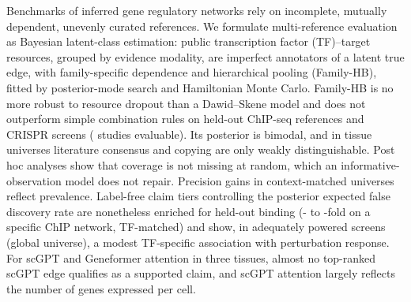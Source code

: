 Benchmarks of inferred gene regulatory networks rely on incomplete, mutually dependent, unevenly curated references.
We formulate multi-reference evaluation as Bayesian latent-class estimation: \nNAnnotHeldin{} public transcription factor (TF)--target resources, grouped by evidence modality, are imperfect annotators of a latent true edge, with family-specific dependence and hierarchical pooling (Family-HB), fitted by posterior-mode search and Hamiltonian Monte Carlo.
Family-HB is no more robust to resource dropout than a Dawid--Skene model and does not outperform simple combination rules on held-out ChIP-seq references and \nCohN{} CRISPR screens (\nRepPassAllD{} studies evaluable).
Its posterior is bimodal, and in tissue universes literature consensus and copying are only weakly distinguishable.
Post hoc analyses show that coverage is not missing at random, which an informative-observation model does not repair.
Precision gains in context-matched universes reflect prevalence.
Label-free claim tiers controlling the posterior expected false discovery rate are nonetheless enriched for held-out binding (\nGovOeEnetMin{}- to \nGovOeEnetMax{}-fold on a specific ChIP network, TF-matched) and show, in \nRepPassPowD{} adequately powered screens (global universe), a modest TF-specific association with perturbation response.
For scGPT and Geneformer attention in three tissues, almost no top-ranked scGPT edge qualifies as a supported claim, and scGPT attention largely reflects the number of genes expressed per cell.
